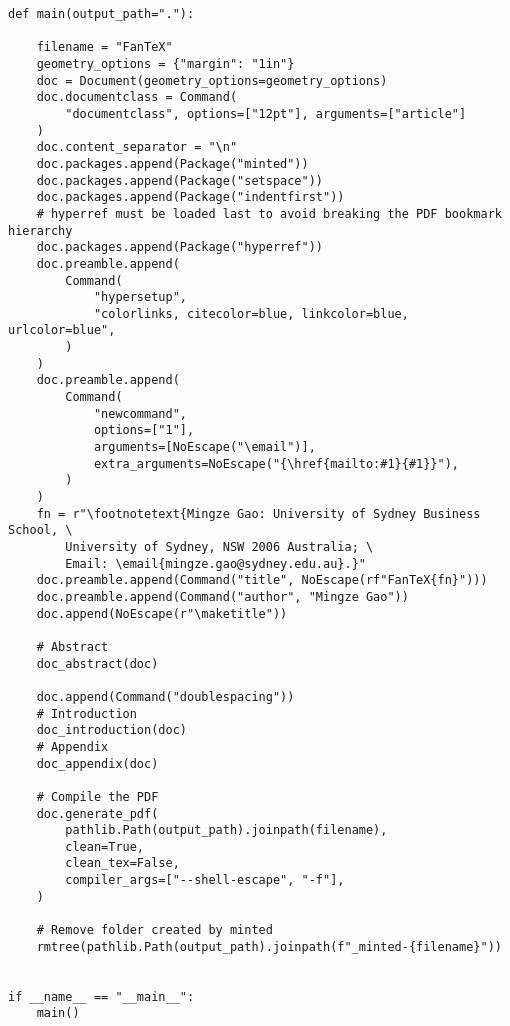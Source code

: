 \documentclass[12pt]{article}%
\newcommand{\email}[1]{{\href{mailto:#1}{#1}}}%
\begin{document}
\begin{verbatim}
def main(output_path="."):

    filename = "FanTeX"
    geometry_options = {"margin": "1in"}
    doc = Document(geometry_options=geometry_options)
    doc.documentclass = Command(
        "documentclass", options=["12pt"], arguments=["article"]
    )
    doc.content_separator = "\n"
    doc.packages.append(Package("minted"))
    doc.packages.append(Package("setspace"))
    doc.packages.append(Package("indentfirst"))
    # hyperref must be loaded last to avoid breaking the PDF bookmark hierarchy
    doc.packages.append(Package("hyperref"))
    doc.preamble.append(
        Command(
            "hypersetup",
            "colorlinks, citecolor=blue, linkcolor=blue, urlcolor=blue",
        )
    )
    doc.preamble.append(
        Command(
            "newcommand",
            options=["1"],
            arguments=[NoEscape("\email")],
            extra_arguments=NoEscape("{\href{mailto:#1}{#1}}"),
        )
    )
    fn = r"\footnotetext{Mingze Gao: University of Sydney Business School, \
        University of Sydney, NSW 2006 Australia; \
        Email: \email{mingze.gao@sydney.edu.au}.}"
    doc.preamble.append(Command("title", NoEscape(rf"FanTeX{fn}")))
    doc.preamble.append(Command("author", "Mingze Gao"))
    doc.append(NoEscape(r"\maketitle"))

    # Abstract
    doc_abstract(doc)

    doc.append(Command("doublespacing"))
    # Introduction
    doc_introduction(doc)
    # Appendix
    doc_appendix(doc)

    # Compile the PDF
    doc.generate_pdf(
        pathlib.Path(output_path).joinpath(filename),
        clean=True,
        clean_tex=False,
        compiler_args=["--shell-escape", "-f"],
    )

    # Remove folder created by minted
    rmtree(pathlib.Path(output_path).joinpath(f"_minted-{filename}"))


if __name__ == "__main__":
    main()

\end{verbatim}
\end{document}
